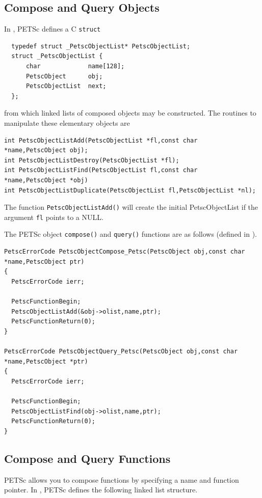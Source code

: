 \subsection{Compose and Query Objects}
In \href{http://www.mcs.anl.gov/petsc/petsc-master/src/objects/olist.c.html}{}, PETSc defines a C \lstinline{struct}
\begin{lstlisting}
  typedef struct _PetscObjectList* PetscObjectList;
  struct _PetscObjectList {
      char             name[128];
      PetscObject      obj;
      PetscObjectList  next;
  };
\end{lstlisting}
from which linked lists of composed objects may be constructed. The routines
to manipulate these elementary objects are
\begin{lstlisting}
int PetscObjectListAdd(PetscObjectList *fl,const char *name,PetscObject obj);
int PetscObjectListDestroy(PetscObjectList *fl);
int PetscObjectListFind(PetscObjectList fl,const char *name,PetscObject *obj)
int PetscObjectListDuplicate(PetscObjectList fl,PetscObjectList *nl);
\end{lstlisting}
The function \lstinline{PetscObjectListAdd()} will create the initial PetscObjectList if the argument
\lstinline{fl} points to a NULL.

The PETSc object \lstinline{compose()} and \lstinline{query()} functions are
as follows (defined in \href{http://www.mcs.anl.gov/petsc/petsc-master/src/objects/inherit.c.html}{}).
\begin{lstlisting}
PetscErrorCode PetscObjectCompose_Petsc(PetscObject obj,const char *name,PetscObject ptr)
{
  PetscErrorCode ierr;

  PetscFunctionBegin;
  PetscObjectListAdd(&obj->olist,name,ptr);
  PetscFunctionReturn(0);
}

PetscErrorCode PetscObjectQuery_Petsc(PetscObject obj,const char *name,PetscObject *ptr)
{
  PetscErrorCode ierr;

  PetscFunctionBegin;
  PetscObjectListFind(obj->olist,name,ptr);
  PetscFunctionReturn(0);
}
\end{lstlisting}

\subsection{Compose and Query Functions}

PETSc allows you to compose functions by specifying a name and function pointer.
In \href{http://www.mcs.anl.gov/petsc/petsc-master/src/sys/dll/reg.c.html}{},
PETSc defines the following linked list structure.


